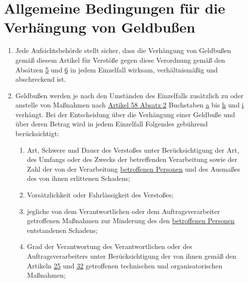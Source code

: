 \chapter{Allgemeine Bedingungen für die Verhängung von Geldbußen}
\label{ch:83}


\begin{enumerate}

  \item Jede Aufsichtsbehörde stellt sicher, dass die Verhängung von Geldbußen gemäß diesem Artikel für Verstöße gegen
   diese Verordnung gemäß den Absätzen \hyperref[itm:83-5]{5} und \hyperref[itm:83-6]{6} in jedem Einzelfall wirksam,
   verhältnismäßig und abschreckend ist.
  \label{itm:83-1}

  \item Geldbußen werden je nach den Umständen des Einzelfalls zusätzlich zu oder anstelle von Maßnahmen nach \hyperref
   [itm:58-2]{Artikel 58 Absatz 2} Buchstaben \hyperref[itm:58-2a]{a} bis \hyperref[itm:58-2h]{h} und \hyperref
   [itm:58-2i]{i} verhängt. Bei der Entscheidung über die Verhängung einer Geldbuße und über deren Betrag wird in jedem
   Einzelfall Folgendes gebührend berücksichtigt:
  \label{itm:83-2}

  \begin{enumerate}
  
    \item Art, Schwere und Dauer des Verstoßes unter Berücksichtigung der Art, des Umfangs oder des Zwecks der
     betreffenden Verarbeitung sowie der Zahl der von der Verarbeitung \hyperref[itm:04-1]{betroffenen Personen} und des Ausmaßes des von
     ihnen erlittenen Schadens;
    \label{itm:83-2a}

    \item Vorsätzlichkeit oder Fahrlässigkeit des Verstoßes;
    \label{itm:83-2b}

    \item jegliche von dem Verantwortlichen oder dem Auftragsverarbeiter getroffenen Maßnahmen zur Minderung des den
     \hyperref[itm:04-1]{betroffenen Personen} entstandenen Schadens;
    \label{itm:83-2c}

    \item Grad der Verantwortung des Verantwortlichen oder des Auftragsverarbeiters unter Berücksichtigung der von ihnen
     gemäß den Artikeln \hyperref[ch:25]{25} und \hyperref[ch:32]{32} getroffenen technischen und organisatorischen
     Maßnahmen;
    \label{itm:83-2d}


\end{enumerate}
\end{enumerate}
